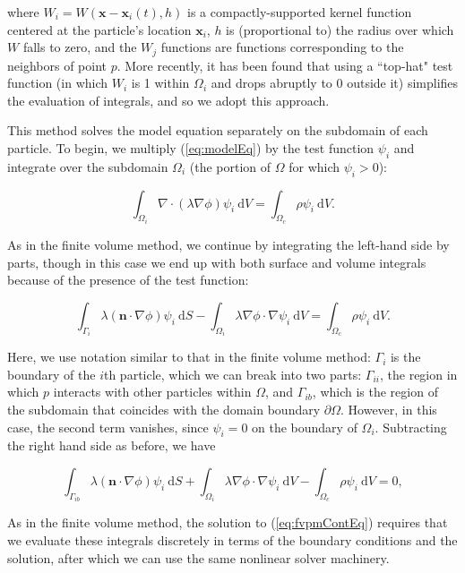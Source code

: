 \documentclass[12pt]{article}
\newcommand{\labelEq}[1]{\label{eq:#1}}
\newcommand{\refEq}[1]{(\ref{eq:#1})}
\renewcommand{\vec}[1]{\mathbf{#1}}
\newcommand{\diverg}[1]{\nabla\cdot#1}
\newcommand{\grad}[1]{\nabla#1}
\newcommand{\dV}{~\mathrm{d}V}
\newcommand{\dS}{~\mathrm{d}S}
\begin{document}
\noindent
where $W_i = W(\vec{x} - \vec{x}_i(t), h)$ is a compactly-supported kernel function centered at the particle's location $\vec{x}_i$, 
$h$ is (proportional to) the radius over which $W$ falls to zero, and the $W_j$ functions are functions corresponding to the neighbors 
of point $p$. More recently, it has been found that using a ``top-hat" test function (in which $W_i$ is 1 within $\Omega_i$ and drops 
abruptly to 0 outside it) simplifies the evaluation of integrals, and so we adopt this approach.

This method solves the model equation separately on the subdomain of each particle. To begin, we multiply \refEq{modelEq} by the test function $\psi_i$ and 
integrate over the subdomain $\Omega_i$ (the portion of $\Omega$ for which $\psi_i > 0$):

\begin{equation}
\int_{\Omega_i} \diverg(\lambda \grad{\phi}) \psi_i \dV = \int_{\Omega_c} \rho \psi_i \dV.
\end{equation}

As in the finite volume method, we continue by integrating the left-hand side by parts, though in this case we end up with both surface and
volume integrals because of the presence of the test function:

\begin{equation}
\int_{\Gamma_i} \lambda (\vec{n}\cdot\grad{\phi}) \psi_i \dS - 
\int_{\Omega_i} \lambda \grad{\phi}\cdot\grad{\psi_i} \dV = \int_{\Omega_c} \rho \psi_i \dV.
\end{equation}

\noindent
Here, we use notation similar to that in the finite volume method: $\Gamma_i$ is the boundary of the $i$th particle, which we can break into 
two parts: $\Gamma_{ii}$, the region in which $p$ interacts with other particles within $\Omega$, and $\Gamma_{ib}$, which is the region of
the subdomain that coincides with the domain boundary $\partial\Omega.$ However, 
in this case, the second term vanishes, since $\psi_i = 0$ on the boundary of $\Omega_i$.
Subtracting the right hand side as before, we have

\begin{equation}
\int_{\Gamma_{ib}} \lambda (\vec{n}\cdot\grad{\phi}) \psi_i \dS + 
\int_{\Omega_i} \lambda \grad{\phi}\cdot\grad{\psi_i} \dV - 
\int_{\Omega_c} \rho \psi_i \dV = 0, \labelEq{fvpmContEq}
\end{equation}

\noindent 
As in the finite volume method, the solution to \refEq{fvpmContEq} requires that we evaluate these integrals discretely in terms of the 
boundary conditions and the solution, after which we can use the same nonlinear solver machinery.
\end{document}
